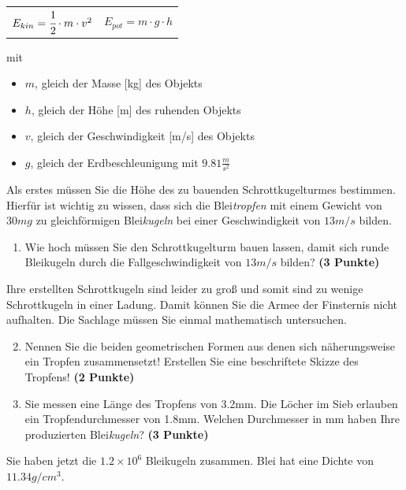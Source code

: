 \documentclass[a4paper, 10pt]{scrartcl}\usepackage[]{graphicx}\usepackage[]{xcolor}
\begin{document}
\begin{center}
  \begin{tabular}{cc}
    $E_{kin} = \cfrac{1}{2}\cdot m \cdot v^2$ & $E_{pot} = m \cdot g \cdot h$\\
  \end{tabular}
\end{center}

mit

\begin{itemize}
\item $m$, gleich der Masse [kg] des Objekts
\item $h$, gleich der H{\"o}he [m] des ruhenden Objekts
\item $v$, gleich der Geschwindigkeit [m/s] des Objekts
\item $g$, gleich der Erdbeschleunigung mit $9.81 \tfrac{m}{s^2}$ 
\end{itemize}

Als erstes m{\"u}ssen Sie die H{\"o}he des zu bauenden Schrottkugelturmes
bestimmen. Hierf{\"u}r ist wichtig zu wissen, dass sich die
Blei\textit{tropfen} mit einem Gewicht von $30mg$ zu
gleichf{\"o}rmigen Blei\textit{kugeln} bei einer Geschwindigkeit von
$13m/s$ bilden.

\begin{enumerate}
\item Wie hoch m{\"u}ssen Sie den Schrottkugelturm bauen lassen, damit sich
  runde Bleikugeln durch die Fallgeschwindigkeit von $13m/s$ bilden?
  \textbf{(3 Punkte)}
\end{enumerate}

Ihre erstellten Schrottkugeln sind leider zu gro{\ss} und somit sind zu wenige
Schrottkugeln in einer Ladung. Damit k{\"o}nnen Sie die Armee der Finsternis
nicht aufhalten. Die Sachlage m{\"u}ssen Sie einmal mathematisch untersuchen.

\begin{enumerate}
  \setcounter{enumi}{1}
\item Nennen Sie die beiden geometrischen Formen aus denen sich
  n{\"a}herungsweise ein Tropfen zusammensetzt! Erstellen Sie eine beschriftete 
  Skizze des Tropfens!
  \textbf{(2 Punkte)}
\item Sie messen eine L{\"a}nge des Tropfens von 3.2mm. Die L{\"o}cher
  im Sieb erlauben ein Tropfendurchmesser von 1.8mm. Welchen
  Durchmesser in mm haben Ihre produzierten Blei\textit{kugeln}?  \textbf{(3 Punkte)}
\end{enumerate}

Sie haben jetzt die \ensuremath{1.2\times 10^{6}} Bleikugeln zusammen. Blei hat eine Dichte
von $11.34g/cm^3$.
\end{document}
